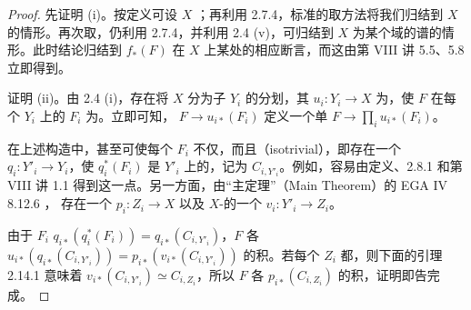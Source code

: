 \begin{proof}
先证明 (i)。按定义可设 $X$ ；再利用 2.7.4，标准的取方法将我们归结到 $X$ 的情形。再次取，仍利用 2.7.4，并利用 2.4 (v)，可归结到 $X$ 为某个域的谱的情形。此时结论归结到 $f_*(F)$ 在 $X$ 上某处的相应断言，而这由第 VIII 讲 5.5、5.8 立即得到。

证明 (ii)。由 2.4 (i)，存在将 $X$ 分为子 $Y_i$ 的分划，其 $u_i:Y_i\to X$ 为，使 $F$ 在每个 $Y_i$ 上的 $F_i$ 为。立即可知， $F\to u_{i*}(F_i)$ 定义一个单 $F\to\prod_iu_{i*}(F_i)$。

在上述构造中，甚至可使每个 $F_i$ 不仅，而且（isotrivial），即存在一个 $q_i:Y'_i\to Y_i$，使 $q_i^*(F_i)$ 是 $Y'_i$ 上的，记为 $C_{i,Y'_i}$。例如，容易由定义、2.8.1 和第 VIII 讲 1.1 得到这一点。另一方面，由“主定理”（Main Theorem）的 EGA IV 8.12.6 ，
存在一个 $p_i:Z_i\to X$ 以及 $X$-的一个 $v_i:Y'_i\to Z_i$。

由于 $F_i$  $q_{i*}(q_i^*(F_i))=q_{i*}(C_{i,Y'_i})$，$F$ 各 $u_{i*}(q_{i*}(C_{i,Y'_i}))=p_{i*}(v_{i*}(C_{i,Y'_i}))$ 的积。若每个 $Z_i$ 都，则下面的引理 2.14.1 意味着 $v_{i*}(C_{i,Y'_i})\simeq C_{i,Z_i}$，所以 $F$ 各 $p_{i*}(C_{i,Z_i})$ 的积，证明即告完成。


\end{proof}
